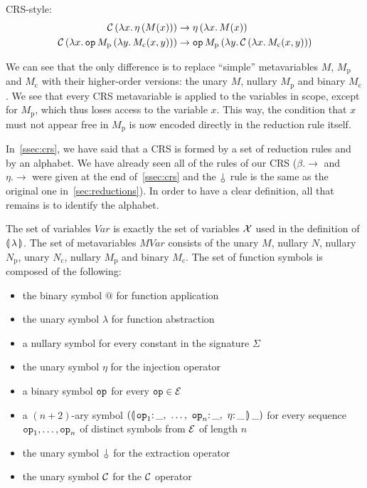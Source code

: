CRS-style:
\begin{align*}
  \mathcal{C}\,(\lambda x.\, \eta\,(M(x))) & \to \eta\,(\lambda x.\, M(x)) \\
  \mathcal{C}\,(\lambda x.\, \mathtt{op}\,M_{\mathrm{p}}\,(\lambda y.\, M_{\mathrm{c}}(x,y)))
  & \to \mathtt{op}\,M_{\mathrm{p}}\,(\lambda y.\, \mathcal{C}\,(\lambda x.\, M_{\mathrm{c}}(x,y)))
\end{align*}

We can see that the only difference is to replace ``simple'' metavariables
$M$, $M_{\mathrm{p}}$ and $M_{\mathrm{c}}$ with their higher-order
versions: the unary $M$, nullary $M_{\mathrm{p}}$ and binary
$M_{\mathrm{c}}$. We see that every CRS metavariable is applied to the
variables in scope, except for $M_{\mathrm{p}}$, which thus loses access to
the variable $x$. This way, the condition that $x$ must not appear free in
$M_{\mathrm{p}}$ is now encoded directly in the reduction rule itself.

In~\ref{ssec:crs}, we have said that a CRS is formed by a set of reduction
rules and by an alphabet. We have already seen all of the rules of our CRS
($\beta.\to$ and $\eta.\to$ were given at the end of~\ref{ssec:crs} and the
$\cherry$ rule is the same as the original one in~\ref{sec:reductions}). In
order to have a clear definition, all that remains is to identify the
alphabet.

The set of variables $Var$ is exactly the set of variables $\mathcal{X}$ used in
the definition of $\llparenthesis \, \lambda \, \rrparenthesis$. The set of metavariables $MVar$
consists of the unary $M$, nullary $N$, nullary $N_{\mathrm{p}}$, unary
$N_{\mathrm{c}}$, nullary $M_{\mathrm{p}}$ and binary $M_{\mathrm{c}}$. The
set of function symbols is composed of the following:

\begin{itemize}
\item the binary symbol $@$ for function application
\item the unary symbol $\lambda$ for function abstraction
\item a nullary symbol for every constant in the signature $\Sigma$
\item the unary symbol $\eta$ for the injection operator
\item a binary symbol $\mathtt{op}$ for every $\mathtt{op} \in \mathcal{E}$
\item a $(n+2)$-ary symbol
  $(\ap{\banana{\onto{\op{op}_1}{\_},\ \ldots,\ \onto{\op{op}_n}{\_},\ \onto{\eta}{\_}}}{\_})$
  for every sequence $\mathtt{op}_1,\ldots,\mathtt{op}_n$ of distinct symbols from
  $\mathcal{E}$ of length $n$
\item the unary symbol $\cherry$ for the extraction operator
\item the unary symbol $\mathcal{C}$ for the $\mathcal{C}$ operator
\end{itemize}

